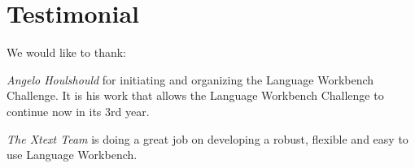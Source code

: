 \section*{Testimonial}

We would like to thank:
\begin{compactenum}
  \item \emph{Angelo Houlshould} for initiating and organizing the Language
  Workbench Challenge. It is his work that allows the Language Workbench
  Challenge to continue now in its 3rd year.
  \item \emph{The Xtext Team} is doing a great job on developing a robust,
  flexible and easy to use Language Workbench. 
\end{compactenum}
